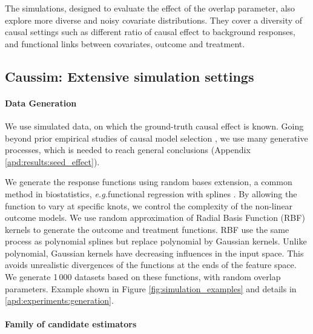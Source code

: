 \documentclass[a4paper,num-refs]{oup-contemporary}%
\newcommand{\eg}{\emph{e.g.}}
\begin{document}
The simulations, designed to evaluate the effect of the overlap
parameter, also explore more diverse and noisy covariate distributions.
They cover a diversity of causal settings such as different ratio of causal effect to background responses, and functional links between covariates, outcome and treatment.

\subsection{Caussim: Extensive simulation settings}\label{subsec:simulations}

\paragraph{Data Generation}

We use simulated data, on which the ground-truth causal effect is known. Going
beyond prior empirical studies of causal model selection
\cite{schuler_comparison_2018,alaa_validating_2019}, we use many
generative processes, which is needed to reach general conclusions (Appendix \ref{apd:results:seed_effect}).

We generate the response functions using random bases extension, a common method
in biostatistics, \eg functional regression with splines
\cite{howe_splines_2011, perperoglou_review_2019}. By allowing the function to
vary at specific knots, we control the complexity of the non-linear outcome
models. We use random approximation of Radial Basis Function (RBF) kernels
\cite{rahimi_random_2008} to generate the outcome and treatment functions. RBF
use the same process as polynomial splines but replace polynomial by Gaussian
kernels. Unlike polynomial, Gaussian kernels have decreasing influences in the
input space. This avoids unrealistic divergences of the functions at the
ends of the feature space. We generate 1\,000 datasets based on these functions,
with random overlap parameters. Example shown in Figure
\ref{fig:simulation_examples} and details in \ref{apd:experiments:generation}.

%

\paragraph{Family of candidate estimators}
\end{document}
